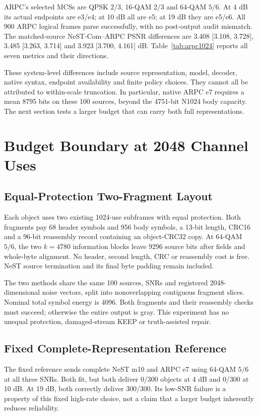 ARPC's selected MCSs are QPSK $2/3$, 16-QAM $2/3$ and 64-QAM $5/6$. At 4 dB its actual endpoints are e3/e4; at 10 dB all are e5; at 19 dB they are e5/e6. All 900 ARPC logical frames parse successfully, with no post-output audit mismatch. The matched-source NeST-Com--ARPC PSNR differences are 3.408 [3.108, 3.728], 3.485 [3.263, 3.714] and 3.923 [3.700, 4.161] dB. Table~\ref{tab:arpc1024} reports all seven metrics and their directions.

These system-level differences include source representation, model, decoder, native syntax, endpoint availability and finite policy choices. They cannot all be attributed to within-scale truncation. In particular, native ARPC e7 requires a mean 8795 bits on these 100 sources, beyond the 4751-bit N1024 body capacity. The next section tests a larger budget that can carry both full representations.

\section{Budget Boundary at 2048 Channel Uses}
\subsection{Equal-Protection Two-Fragment Layout}
Each object uses two existing 1024-use subframes with equal protection. Both fragments pay 68 header symbols and 956 body symbols, a 13-bit length, CRC16 and a 96-bit reassembly record containing an object-CRC32 copy. At 64-QAM $5/6$, the two $k=4780$ information blocks leave 9296 source bits after fields and whole-byte alignment. No header, second length, CRC or reassembly cost is free. NeST source termination and its final byte padding remain included.

The two methods share the same 100 sources, SNRs and registered 2048-dimensional noise vectors, split into nonoverlapping contiguous fragment slices. Nominal total symbol energy is 4096. Both fragments and their reassembly checks must succeed; otherwise the entire output is gray. This experiment has no unequal protection, damaged-stream KEEP or truth-assisted repair.

\subsection{Fixed Complete-Representation Reference}

The fixed reference sends complete NeST m10 and ARPC e7 using 64-QAM $5/6$ at all three SNRs. Both fit, but both deliver 0/300 objects at 4 dB and 0/300 at 10 dB. At 19 dB, both correctly deliver 300/300. Its low-SNR failure is a property of this fixed high-rate choice, not a claim that a larger budget inherently reduces reliability.

